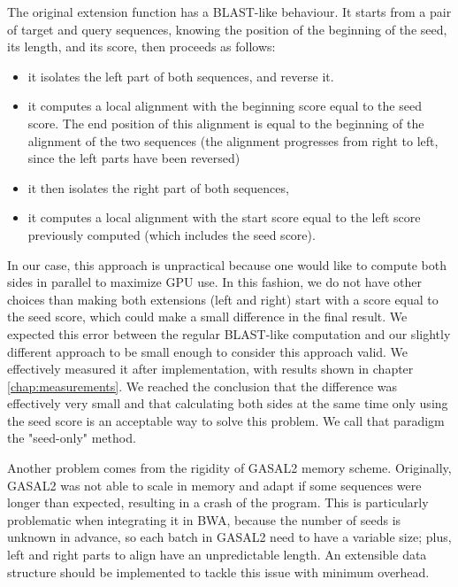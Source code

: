 The original extension function has a BLAST-like behaviour. It starts from a pair of target and query sequences, knowing the position of the beginning of the seed, its length, and its score, then proceeds as follows:
\begin{itemize}
	\item it isolates the left part of both sequences, and reverse it.
	\item it computes a local alignment with the beginning score equal to the seed score. The end position of this alignment is equal to the beginning of the alignment of the two sequences (the alignment progresses from right to left, since the left parts have been reversed)
	\item it then isolates the right part of both sequences,
	\item it computes a local alignment with the start score equal to the left score previously computed (which includes the seed score).
\end{itemize}

In our case, this approach is unpractical because one would like to compute both sides in parallel to maximize GPU use. In this fashion, we do not have other choices than making both extensions (left and right) start with a score equal to the seed score, which could make a small difference in the final result. We expected this error between the regular BLAST-like computation and our slightly different approach to be small enough to consider this approach valid. We effectively measured it after implementation, with results shown in chapter \ref{chap:measurements}. We reached the conclusion that the difference was effectively very small and that calculating both sides at the same time only using the seed score is an acceptable way to solve this problem. We call that paradigm the "seed-only" method.

Another problem comes from the rigidity of GASAL2 memory scheme. Originally, GASAL2 was not able to scale in memory and adapt if some sequences were longer than expected, resulting in a crash of the program. This is particularly problematic when integrating it in BWA, because the number of seeds is unknown in advance, so each batch in GASAL2 need to have a variable size; plus, left and right parts to align have an unpredictable length. 
An extensible data structure should be implemented to tackle this issue with minimum overhead.


